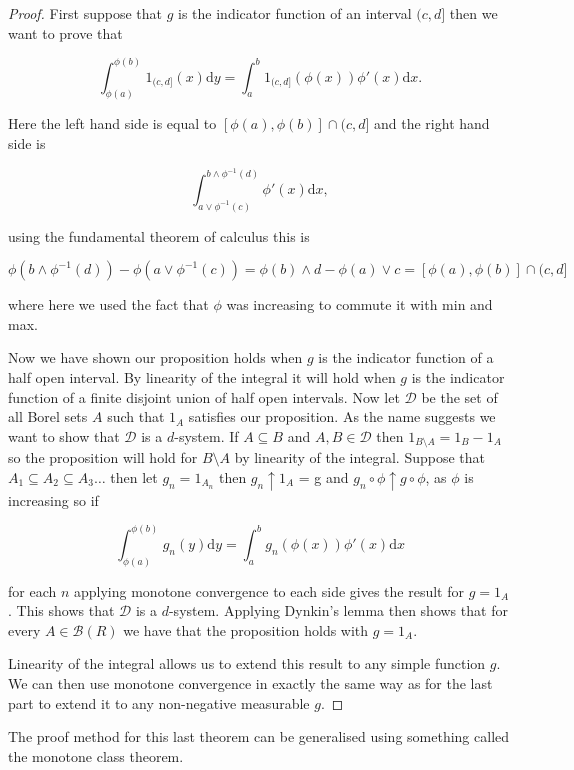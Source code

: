 \documentclass[
]{book}
\theoremstyle{definition}
\theoremstyle{definition}
\theoremstyle{definition}
\theoremstyle{definition}
\theoremstyle{remark}
\begin{document}
\begin{proof}
First suppose that \(g\) is the indicator function of an interval \((c,d]\) then we want to prove that

\[ \int_{\phi(a)}^{\phi(b)} 1_{(c,d]}(x) \mathrm{d}y = \int_a^b  1_{(c,d]}(\phi(x)) \phi'(x) \mathrm{d}x.\]

Here the left hand side is equal to \([\phi(a), \phi(b)] \cap (c,d]\) and the right hand side is

\[ \int_{a \vee \phi^{-1}(c)}^{b \wedge \phi^{-1}(d)} \phi'(x) \mathrm{d}x,\]

using the fundamental theorem of calculus this is

\[ \phi(b \wedge \phi^{-1}(d)) - \phi(a \vee \phi^{-1}(c)) = \phi(b) \wedge d - \phi(a) \vee c = [\phi(a), \phi(b)] \cap (c,d] \]

where here we used the fact that \(\phi\) was increasing to commute it with min and max.

Now we have shown our proposition holds when \(g\) is the indicator function of a half open interval. By linearity of the integral it will hold when \(g\) is the indicator function of a finite disjoint union of half open intervals. Now let \(\mathcal{D}\) be the set of all Borel sets \(A\) such that \(1_A\) satisfies our proposition. As the name suggests we want to show that \(\mathcal{D}\) is a \(d\)-system. If \(A \subseteq B\) and \(A, B \in \mathcal{D}\) then \(1_{B \setminus A} = 1_B - 1_A\) so the proposition will hold for \(B \setminus A\) by linearity of the integral. Suppose that \(A_1 \subseteq A_2 \subseteq A_3 \dots\) then let \(g_n=1_{A_n}\) then \(g_n \uparrow 1_A\) = g and \(g_n \circ \phi \uparrow g \circ \phi\), as \(\phi\) is increasing so if

\[ \int_{\phi(a)}^{\phi(b)}g_n(y) \mathrm{d}y = \int_a^b g_n(\phi(x)) \phi'(x) \mathrm{d}x \]

for each \(n\) applying monotone convergence to each side gives the result for \(g = 1_A\). This shows that \(\mathcal{D}\) is a \(d\)-system. Applying Dynkin's lemma then shows that for every \(A \in \mathcal{B}(R)\) we have that the proposition holds with \(g=1_A\).

Linearity of the integral allows us to extend this result to any simple function \(g\). We can then use monotone convergence in exactly the same way as for the last part to extend it to any non-negative measurable \(g\).
\end{proof}

The proof method for this last theorem can be generalised using something called the monotone class theorem.
\end{document}
